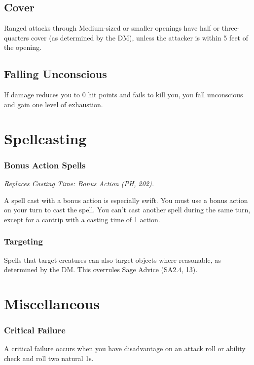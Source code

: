 \documentclass[letterpaper,twocolumn,openany,nodeprecatedcode]{dndbook}
\begin{document}
\subsection{Cover}
Ranged attacks through Medium-sized or smaller openings have half or three-quarters cover (as determined by the DM), unless the attacker is within 5 feet of the opening.

\subsection{Falling Unconscious}
If damage reduces you to 0 hit points and fails to kill you, you fall unconscious and gain one level of exhaustion.







\section{Spellcasting}

\subsubsection{Bonus Action Spells}
\label{bonusActionSpells}
\textit{Replaces Casting Time: Bonus Action (PH, 202).}

A spell cast with a bonus action is especially swift. You must use a bonus action on your turn to cast the spell. You can't cast another spell during the same turn, except for a cantrip with a casting time of 1 action.

\subsubsection{Targeting}
Spells that target creatures can also target objects where reasonable, as determined by the DM. This overrules Sage Advice (SA2.4, 13).




\section{Miscellaneous}

\subsubsection{Critical Failure}
A critical failure occurs when you have disadvantage on an attack roll or ability check and roll two natural 1s.
\end{document}
